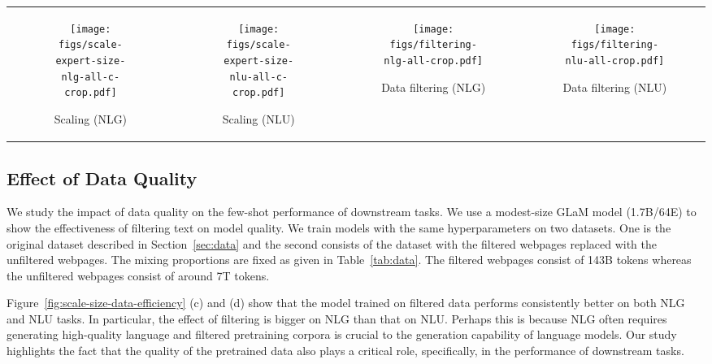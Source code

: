\documentclass{article}
\newcommand{\glam}{GLaM\xspace}
\begin{document}
\begin{figure*}[tb]
\centering
    \renewcommand\tabcolsep{1pt}
\begin{tabular}{cccc}
\begin{subfigure}[b]{0.25\textwidth}
\texttt{[image: figs/scale-expert-size-nlg-all-c-crop.pdf]}
\caption{Scaling (NLG)}
\end{subfigure}
&
\begin{subfigure}[b]{0.25\textwidth}
\texttt{[image: figs/scale-expert-size-nlu-all-c-crop.pdf]}
\caption{Scaling (NLU)}
\end{subfigure}
&
\begin{subfigure}[b]{0.25\textwidth}
\texttt{[image: figs/filtering-nlg-all-crop.pdf]}
\caption{Data filtering (NLG)}
\end{subfigure}
&
\begin{subfigure}[b]{0.25\textwidth}
\texttt{[image: figs/filtering-nlu-all-crop.pdf]}
\caption{Data filtering (NLU)}
\end{subfigure}
\end{tabular}
\caption{Average zero, one and few-shot performance of \glam MoE models versus \glam dense models for similar effective FLOPs per token over the 8 NLG tasks (a) and 21 NLU tasks (b). Comparison of model performance with filtered and unfiltered training data using \glam(1.7B/64E). Filtered data improves results significantly over unfiltered data for both (c) NLG and (d) NLU tasks across zero, one and few-shot settings.}
\label{fig:scale-size-data-efficiency}
\end{figure*}

\subsection{Effect of Data Quality}
\label{sec:data-quality}
We study the impact of data quality on the few-shot performance of downstream tasks. We use a modest-size GLaM model (1.7B/64E) to show the effectiveness of filtering text on model quality. We train models with the same hyperparameters on two datasets. One is the original dataset described in Section~\ref{sec:data} and the second consists of the dataset with the filtered webpages replaced with the unfiltered webpages. The mixing proportions are fixed as given in Table~\ref{tab:data}. The filtered webpages consist of 143B tokens whereas the unfiltered webpages consist of around 7T tokens.


Figure~\ref{fig:scale-size-data-efficiency} (c) and (d) show that the model trained on filtered data performs consistently better on both NLG and NLU tasks. In particular, the effect of filtering is bigger on NLG than that on NLU. Perhaps this is because NLG often requires generating high-quality language and filtered pretraining corpora is crucial to the generation capability of language models.
Our study highlights the fact that the quality of the pretrained data also plays a critical role, specifically, in the performance of downstream tasks.
\end{document}
